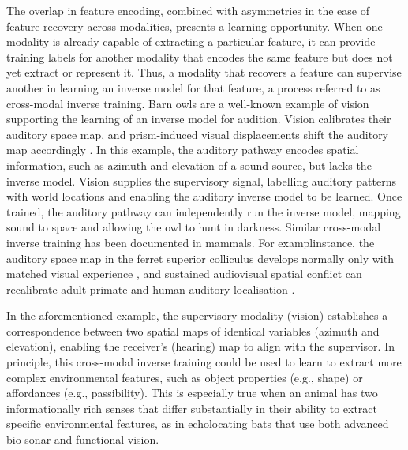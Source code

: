 \documentclass[11pt]{article}
\newcommand{\cmt}{cross-modal inverse training}
\begin{document}
The overlap in feature encoding, combined with asymmetries in the ease of feature recovery across modalities, presents a learning opportunity. When one modality is already capable of extracting a particular feature, it can provide training labels for another modality that encodes the same feature but does not yet extract or represent it. Thus, a modality that recovers a feature can supervise another in learning an inverse model for that feature, a process referred to as \cmt. Barn owls are a well-known example of vision supporting the learning of an inverse model for audition. Vision calibrates their auditory space map, and prism-induced visual displacements shift the auditory map accordingly \citep{Knudsen1995}. In this example, the auditory pathway encodes spatial information, such as azimuth and elevation of a sound source, but lacks the inverse model. Vision supplies the supervisory signal, labelling auditory patterns with world locations and enabling the auditory inverse model to be learned. Once trained, the auditory pathway can independently run the inverse model, mapping sound to space and allowing the owl to hunt in darkness. Similar cross-modal inverse training has been documented in mammals. For examplinstance, the auditory space map in the ferret superior colliculus develops normally only with matched visual experience \citep{King1995}, and sustained audiovisual spatial conflict can recalibrate adult primate and human auditory localisation \citep{Recanzone1998,Hofman1998}.


In the aforementioned example, the supervisory modality (vision) establishes a correspondence between two spatial maps of identical variables (azimuth and elevation), enabling the receiver's (hearing) map to align with the supervisor. In principle, this cross-modal inverse training could be used to learn to extract more complex environmental features, such as object properties (e.g., shape) or affordances (e.g., passibility). This is especially true when an animal has two informationally rich senses that differ substantially in their ability to extract specific environmental features, as in echolocating bats that use both advanced bio-sonar and functional vision.
\end{document}
